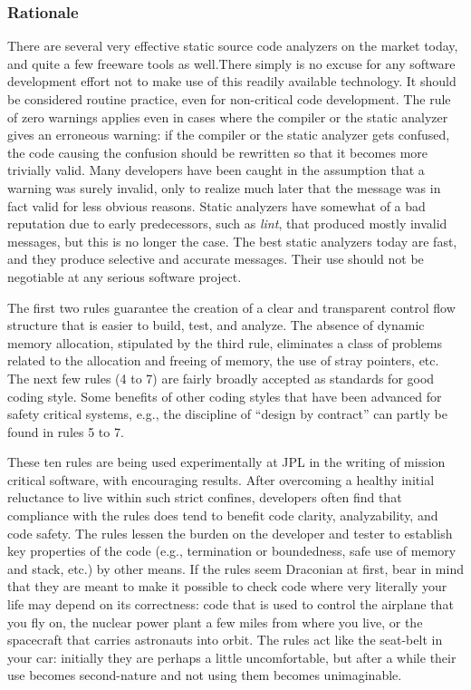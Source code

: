 \documentclass[11pt,oneside]{article}
\begin{document}
\subsubsection*{Rationale}

There are several very effective static source code analyzers on the market
today, and quite a few freeware tools as well.\footnotemark There simply is no
excuse for any software development effort not to make use of this readily
available technology. It should be considered routine practice, even for
non-critical code development. The rule of zero warnings applies even in cases
where the compiler or the static analyzer gives an erroneous warning: if the
compiler or the static analyzer gets confused, the code causing the confusion
should be rewritten so that it becomes more trivially valid. Many developers
have been caught in the assumption that a warning was surely invalid, only to
realize much later that the message was in fact valid for less obvious reasons.
Static analyzers have somewhat of a bad reputation due to early predecessors,
such as \emph{lint}, that produced mostly invalid messages, but this is no
longer the case.  The best static analyzers today are fast, and they produce
selective and accurate messages. Their use should not be negotiable at any
serious software project.


The first two rules guarantee the creation of a clear and transparent control
flow structure that is easier to build, test, and analyze. The absence of
dynamic memory allocation, stipulated by the third rule, eliminates a class of
problems related to the allocation and freeing of memory, the use of stray
pointers, etc. The next few rules (4 to 7) are fairly broadly accepted as
standards for good coding style.  Some benefits of other coding styles that
have been advanced for safety critical systems, e.g., the discipline of
``design by contract'' can partly be found in rules 5 to 7.

These ten rules are being used experimentally at JPL in the writing of mission
critical software, with encouraging results. After overcoming a healthy initial
reluctance to live within such strict confines, developers often find that
compliance with the rules does tend to benefit code clarity, analyzability,
and code safety. The rules lessen the burden on the developer and tester to
establish key properties of the code (e.g., termination or boundedness, safe use
of memory and stack, etc.) by other means. If the rules seem Draconian at first,
bear in mind that they are meant to make it possible to check code where very
literally your life may depend on its correctness: code that is used to control
the airplane that you fly on, the nuclear power plant a few miles from where you
live, or the spacecraft that carries astronauts into orbit. The rules act like
the seat-belt in your car: initially they are perhaps a little uncomfortable,
but after a while their use becomes second-nature and not using them becomes
unimaginable.
\end{document}
